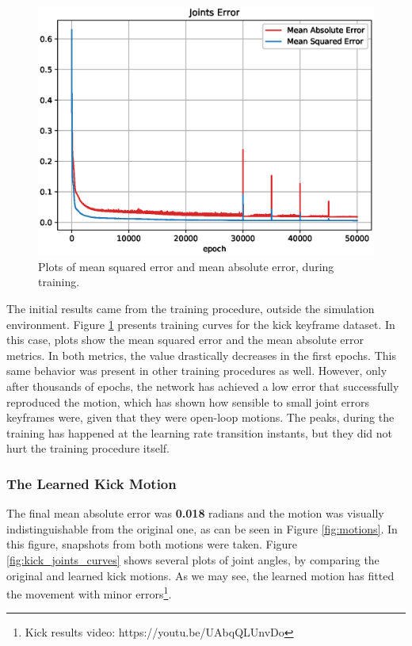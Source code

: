 \begin{figure}[!htbp]
	\centering
	\includegraphics[width=1\textwidth]{Cap6/errors}
	\caption{Plots of mean squared error and mean absolute error, during training.}
	\label{fig:errors}
\end{figure}

The initial results came from the training procedure, outside the simulation environment. Figure \ref{fig:errors} presents training curves for the kick keyframe dataset. In this case, plots show the mean squared error and the mean absolute error metrics. In both metrics, the value drastically decreases in the first epochs. This same behavior was present in other training procedures as well. However, only after thousands of epochs, the network has achieved a low error that successfully reproduced the motion, which has shown how sensible to small joint errors keyframes were, given that they were open-loop motions. The peaks, during the training has happened at the learning rate transition instants, but they did not hurt the training procedure itself.

\subsubsection{The Learned Kick Motion}

The final mean absolute error was \textbf{0.018} radians and the motion was visually indistinguishable from the original one, as can be seen in Figure \ref{fig:motions}. In this figure, snapshots from both motions were taken. Figure \ref{fig:kick_joints_curves} shows several plots of joint angles, by comparing the original and learned kick motions. As we may see, the learned motion has fitted the movement with minor errors\footnote{\label{footnote_walk} Kick results video: https://youtu.be/UAbqQLUnvDo}.

